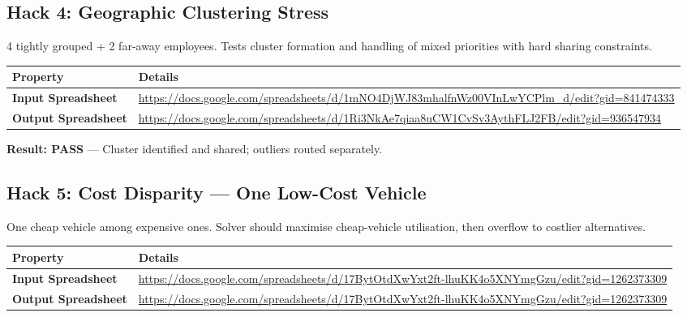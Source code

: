 \documentclass[11pt,a4paper]{article}
\begin{document}
\subsection{Hack 4: Geographic Clustering Stress}

\begin{hackbox}
4 tightly grouped + 2 far-away employees. Tests cluster formation and handling of mixed priorities with hard sharing constraints.
\end{hackbox}

\begin{table}[H]
\centering
\small
\begin{tabular}{p{3.5cm}p{10cm}}
\toprule
\textbf{Property} & \textbf{Details} \\
\midrule
\rowcolor{rowalt}
\textbf{Input Spreadsheet} & \scriptsize\url{https://docs.google.com/spreadsheets/d/1mNO4DjWJ83mhalfnWz00VInLwYCPlm_d/edit?gid=841474333} \\
\textbf{Output Spreadsheet} & \scriptsize\url{https://docs.google.com/spreadsheets/d/1Ri3NkAe7qiaa8uCW1CvSv3AythFLJ2FB/edit?gid=936547934} \\
\bottomrule
\end{tabular}
\end{table}

\begin{resultbox}
\textbf{Result: \textcolor{velgreen}{PASS}} --- Cluster identified and shared; outliers routed separately.
\end{resultbox}

\subsection{Hack 5: Cost Disparity --- One Low-Cost Vehicle}

\begin{hackbox}
One cheap vehicle among expensive ones. Solver should maximise cheap-vehicle utilisation, then overflow to costlier alternatives.
\end{hackbox}

\begin{table}[H]
\centering
\small
\begin{tabular}{p{3.5cm}p{10cm}}
\toprule
\textbf{Property} & \textbf{Details} \\
\midrule
\rowcolor{rowalt}
\textbf{Input Spreadsheet} & \scriptsize\url{https://docs.google.com/spreadsheets/d/17BytOtdXwYxt2ft-lhuKK4o5XNYmgGzu/edit?gid=1262373309} \\
\textbf{Output Spreadsheet} & \scriptsize\url{https://docs.google.com/spreadsheets/d/17BytOtdXwYxt2ft-lhuKK4o5XNYmgGzu/edit?gid=1262373309} \\
\bottomrule
\end{tabular}
\end{table}
\end{document}
